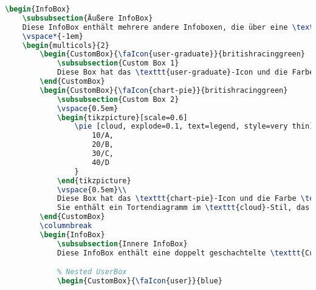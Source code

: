	\begin{lstlisting}[language=tex]
\begin{InfoBox}
    \subsubsection{Äußere InfoBox}
    Diese InfoBox enthält mehrere andere Infoboxen, die über eine \texttt{multicols}-Umgebung in zwei Spalten angeordnet sind.
    \vspace*{-1em}
    \begin{multicols}{2}
        \begin{CustomBox}{\faIcon{user-graduate}}{britishracinggreen}
            \subsubsection{Custom Box 1}
            Diese Box hat das \texttt{user-graduate}-Icon und die Farbe \texttt{britishracinggreen}.
        \end{CustomBox}
        \begin{CustomBox}{\faIcon{chart-pie}}{britishracinggreen}
            \subsubsection{Custom Box 2}
            \vspace{0.5em}
            \begin{tikzpicture}[scale=0.6]
                \pie [cloud, explode=0.1, text=legend, style=very thin] {
                    10/A,
                    20/B,
                    30/C,
                    40/D
                }
            \end{tikzpicture}
            \vspace{0.5em}\\
            Diese Box hat das \texttt{chart-pie}-Icon und die Farbe \texttt{britishracinggreen}.
            Sie enthält ein Tortendiagramm im \texttt{cloud}-Stil, das über das \texttt{pgf-pie}-Paket in TikZ erstellt wurde.
        \end{CustomBox}
        \columnbreak
        \begin{InfoBox}
            \subsubsection{Innere InfoBox}
            Diese InfoBox enthält eine doppelt geschachtelte \texttt{CustomBox}.

            % Nested UserBox
            \begin{CustomBox}{\faIcon{user}}{blue}

\end{lstlisting}
